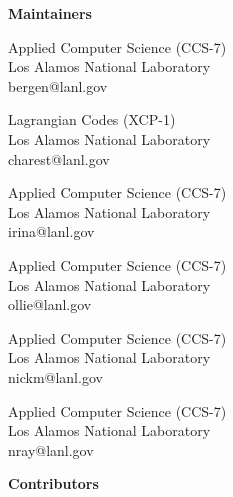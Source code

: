 \begin{multicols}{2}
{\huge \textbf{Maintainers}}

\vspace{0.25cm}

{Applied Computer Science (CCS-7)\\
Los Alamos National Laboratory\\
bergen@lanl.gov}

{Lagrangian Codes (XCP-1)\\
Los Alamos National Laboratory\\
charest@lanl.gov}

{Applied Computer Science (CCS-7)\\
Los Alamos National Laboratory\\
irina@lanl.gov}

{Applied Computer Science (CCS-7)\\
Los Alamos National Laboratory\\
ollie@lanl.gov}

{Applied Computer Science (CCS-7)\\
Los Alamos National Laboratory\\
nickm@lanl.gov}

{Applied Computer Science (CCS-7)\\
Los Alamos National Laboratory\\
nray@lanl.gov}

\vfill
\columnbreak

{\huge \textbf{Contributors}}

\vspace{0.25cm}


\vfill
\end{multicols}

\pagebreak

